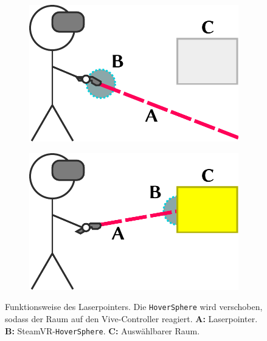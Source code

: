 \begin{figure}[hbt]
    \centering
    \begin{subfigure}{0.5\linewidth}
        \includegraphics[width=\linewidth]{figures/laserpointer_sketch_no_hit}
        \caption{}
        \label{sfig:laserpointer_sketch_no_hit}
    \end{subfigure}%
    \begin{subfigure}{0.5\linewidth}
        \includegraphics[width=\linewidth]{figures/laserpointer_sketch_hit}
        \caption{}
        \label{sfig:laserpointer_sketch_hit}
    \end{subfigure}
    \caption{Funktionsweise des Laserpointers. %
        Die \lstinline|HoverSphere| wird verschoben, sodass der Raum auf den Vive-Controller reagiert. %
        \textbf{A:} Laserpointer. \textbf{B:} SteamVR-\lstinline|HoverSphere|. \textbf{C:} Auswählbarer Raum.}
    \label{fig:laserpointer_sketch}
\end{figure}

%
\cleardoublepage
